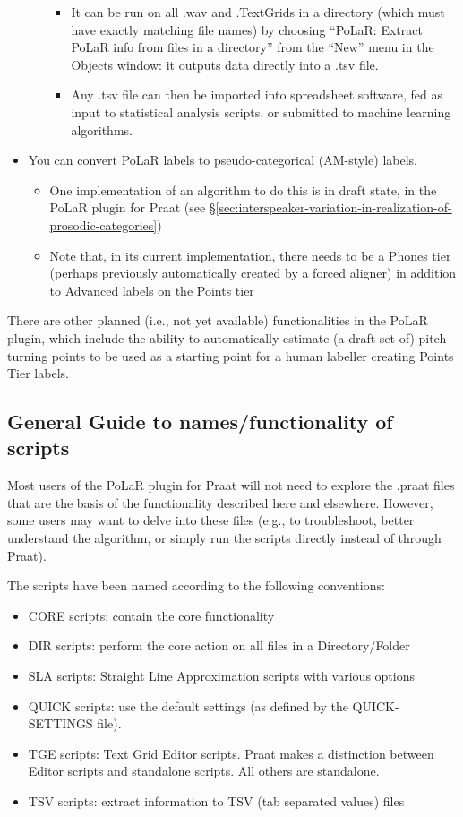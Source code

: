 \documentclass[11pt, twoside]{memoir}
\begin{document}
\begin{itemize}
\begin{itemize}
\begin{itemize}
			\item It can be run on all .wav and .TextGrids in a directory (which must have exactly matching file names) by choosing “PoLaR: Extract PoLaR info from files in a directory” from the “New” menu in the Objects window: it outputs data directly into a .tsv file.
			\item Any .tsv file can then be imported into spreadsheet software, fed as input to statistical analysis scripts, or submitted to machine learning algorithms.
		\end{itemize}
	\end{itemize}
	\item You can convert PoLaR labels to pseudo-categorical (AM-style) labels.
	\begin{itemize}
		\item One implementation of an algorithm to do this is in draft state, in the PoLaR plugin for Praat (see §\ref{sec:interspeaker-variation-in-realization-of-prosodic-categories})
		\item Note that, in its current implementation, there needs to be a Phones tier (perhaps previously automatically created by a forced aligner) in addition to Advanced labels on the Points tier
	\end{itemize}
\end{itemize}

There are other planned (i.e., not yet available) functionalities in the PoLaR plugin, which include the ability to automatically estimate (a draft set of) pitch turning points to be used as a starting point for a human labeller creating Points Tier labels. 

\subsection{General Guide to names/functionality of scripts}
Most users of the PoLaR plugin for Praat will not need to explore the .praat files that are the basis of the functionality described here and elsewhere. However, some users may want to delve into these files (e.g., to troubleshoot, better understand the algorithm, or simply run the scripts directly instead of through Praat).

The scripts have been named according to the following conventions:

\begin{itemize}
	\item CORE scripts: contain the core functionality 
	\item DIR scripts: perform the core action on all files in a Directory\slash Folder
	\item SLA scripts: Straight Line Approximation scripts with various options
	\item QUICK scripts: use the default settings (as defined by the QUICK-SETTINGS file).
	\item TGE scripts: Text Grid Editor scripts. Praat makes a distinction between Editor scripts and standalone scripts. All others are standalone. 
	\item TSV scripts: extract information to TSV (tab separated values) files
\end{itemize}
\end{document}
